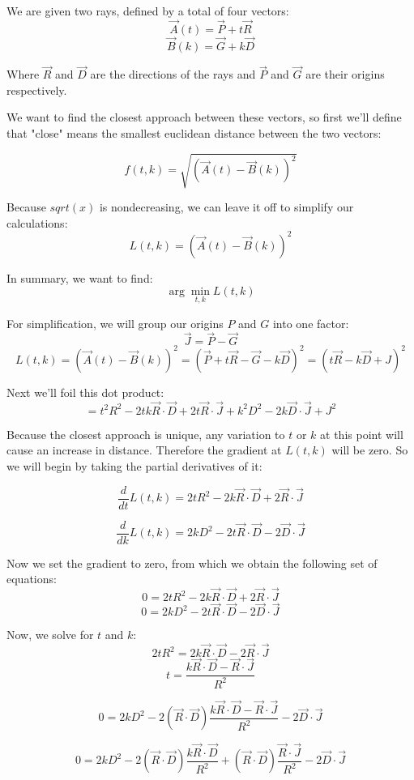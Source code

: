\documentclass[12pt]{article}
\begin{document}
We are given two rays, defined by a total of four vectors:
\[ \vec{A}(t) = \vec{P} + t \vec{R} \]
\[ \vec{B}(k) = \vec{G} + k \vec{D} \]

Where $\vec{R}$ and $\vec{D}$ are the directions of the rays and $\vec{P}$ and $\vec{G}$ are their origins respectively.

We want to find the closest approach between these vectors, so first we'll define that "close" means the smallest euclidean distance between the two vectors:

\[ f(t, k) = \sqrt{\left(\vec{A}(t) - \vec{B}(k)\right)^2} \]

Because $sqrt(x)$ is nondecreasing, we can leave it off to simplify our calculations:
\[ L(t, k) = \left(\vec{A}(t) - \vec{B}(k)\right)^2 \]

In summary, we want to find:
\[ \arg \min_{t, k} L(t, k) \]

For simplification, we will group our origins $P$ and $G$ into one factor:
\[ \vec{J} = \vec{P} - \vec{G} \]
\[ L(t, k) 
    = (\vec{A}(t) - \vec{B}(k))^2 
    = (\vec{P} + t \vec{R} - \vec{G} - k \vec{D})^2 
    = (t \vec{R} - k \vec{D} + J)^2
\]

Next we'll foil this dot product:
\[
    = t^2 R^2 - 2tk\vec{R} \cdot \vec{D} + 2t \vec{R} \cdot \vec{J} + k^2 D^2 -2k \vec{D} \cdot \vec{J} + J^2
\]

Because the closest approach is unique, any variation to $t$ or $k$ at this point will cause an increase in distance. Therefore the gradient at $L(t, k)$ will be zero. So we will begin by taking the partial derivatives of it:

\[ \frac{d}{dt} L(t, k) = 2tR^2 -2k \vec{R} \cdot \vec{D} + 2 \vec{R} \cdot \vec{J} \]

\[ \frac{d}{dk} L(t, k) = 2kD^2 -2t \vec{R} \cdot \vec{D} - 2\vec{D} \cdot \vec{J} \]

Now we set the gradient to zero, from which we obtain the following set of equations:
\[ 0 = 2tR^2 -2k \vec{R} \cdot \vec{D} + 2 \vec{R} \cdot \vec{J} \]
\[ 0 = 2kD^2 -2t \vec{R} \cdot \vec{D} - 2\vec{D} \cdot \vec{J} \]

Now, we solve for $t$ and $k$:
\[ 2tR^2 = 2k \vec{R} \cdot \vec{D} - 2 \vec{R} \cdot \vec{J} \]
\[ t = \frac{k\vec{R}\cdot\vec{D} -\vec{R}\cdot\vec{J}}{R^2} \]

\[ 0 = 2kD^2 -2 (\vec{R} \cdot \vec{D}) \frac{k\vec{R}\cdot\vec{D} -\vec{R}\cdot\vec{J}}{R^2} - 2\vec{D} \cdot \vec{J} \]

\[ 0 = 2kD^2 -2 (\vec{R} \cdot \vec{D}) \frac{k\vec{R}\cdot\vec{D}}{R^2} + (\vec{R} \cdot \vec{D})\frac{\vec{R}\cdot\vec{J}}{R^2} - 2\vec{D} \cdot \vec{J} \]
\end{document}
